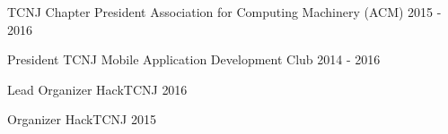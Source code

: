 
\begin{cvhonors}

  \cvhonor
    {TCNJ Chapter President} %
    {Association for Computing Machinery (ACM)} %
    {2015 - 2016} %

  \cvhonor
    {President} %
    {TCNJ Mobile Application Development Club} %
    {2014 - 2016} %

  \cvhonor
    {Lead Organizer} %
    {HackTCNJ} %
    {2016} %

  \cvhonor
    {Organizer} %
    {HackTCNJ} %
    {2015} %


\end{cvhonors}
